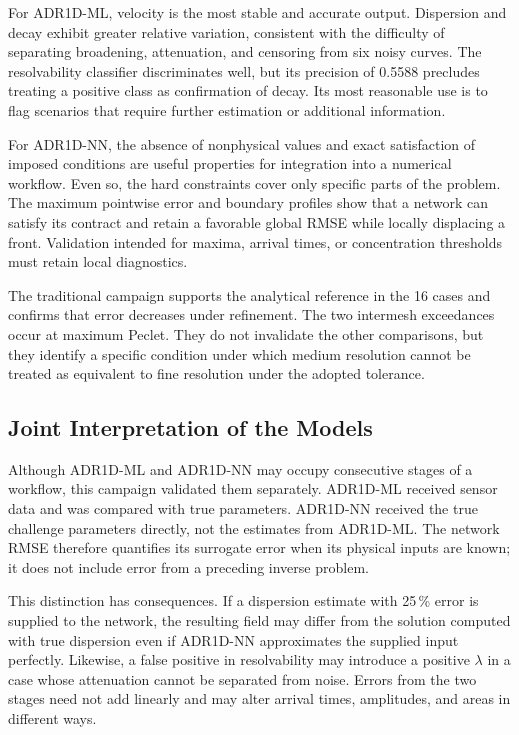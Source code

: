 \documentclass[11pt,a4paper]{article}
\begin{document}
For ADR1D-ML, velocity is the most stable and accurate output. Dispersion and
decay exhibit greater relative variation, consistent with the difficulty of
separating broadening, attenuation, and censoring from six noisy curves. The
resolvability classifier discriminates well, but its precision of 0.5588
precludes treating a positive class as confirmation of decay. Its most
reasonable use is to flag scenarios that require further estimation or
additional information.

For ADR1D-NN, the absence of nonphysical values and exact satisfaction of
imposed conditions are useful properties for integration into a numerical
workflow. Even so, the hard constraints cover only specific parts of the
problem. The maximum pointwise error and boundary profiles show that a network
can satisfy its contract and retain a favorable global RMSE while locally
displacing a front. Validation intended for maxima, arrival times, or
concentration thresholds must retain local diagnostics.

The traditional campaign supports the analytical reference in the 16 cases
and confirms that error decreases under refinement. The two intermesh
exceedances occur at maximum Peclet. They do not invalidate the other
comparisons, but they identify a specific condition under which medium
resolution cannot be treated as equivalent to fine resolution under the
adopted tolerance.

\subsection{Joint Interpretation of the Models}

Although ADR1D-ML and ADR1D-NN may occupy consecutive stages of a workflow,
this campaign validated them separately. ADR1D-ML received sensor data and was
compared with true parameters. ADR1D-NN received the true challenge parameters
directly, not the estimates from ADR1D-ML. The network RMSE therefore
quantifies its surrogate error when its physical inputs are known; it does not
include error from a preceding inverse problem.

This distinction has consequences. If a dispersion estimate with 25\,\% error
is supplied to the network, the resulting field may differ from the solution
computed with true dispersion even if ADR1D-NN approximates the supplied input
perfectly. Likewise, a false positive in resolvability may introduce a positive
$\lambda$ in a case whose attenuation cannot be separated from noise. Errors
from the two stages need not add linearly and may alter arrival times,
amplitudes, and areas in different ways.
\end{document}
